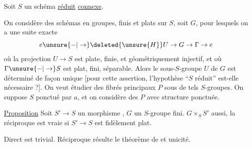Soit $S$ un schéma \uline{réduit} \uline{connexe}.

On considère des schémas en groupes, finis et plats sur $S$,
soit $G$, pour lesquels on a une suite exacte
\[
e\unsure{-|\to}\deleted{\unsure{H}}U\to G\to\Gamma\to e
\]
où la projection $U\to S$ est plate, finie,  et
géométriquement  injectif,
et où $\Gamma\unsure{-|\to}S$ est plat, fini, séparable. Alors le
sous-$S$-groupe $U$ de $G$ est déterminé de
façon unique [pour cette assertion, l'hypothèse
``$S$ réduit'' est-elle nécessaire ?].
On veut étudier des fibrés principaux  $P$ sous
de tels $S$-groupes. On suppose $S$ ponctué
par $a$\deleted{\unsure{$\xi$}}, et on considère des $P$ avec
structure ponctuée.

\uline{Proposition}  Soit $S'\to S$ un morphisme
, $G$ un $S$-groupe
fini.
  $G\times_S S'$ aussi,
la réciproque est vraie si $S'\to S$ est fidèlement plat.

Direct est trivial. Réciproque résulte 
le théorème de  et unicité.
